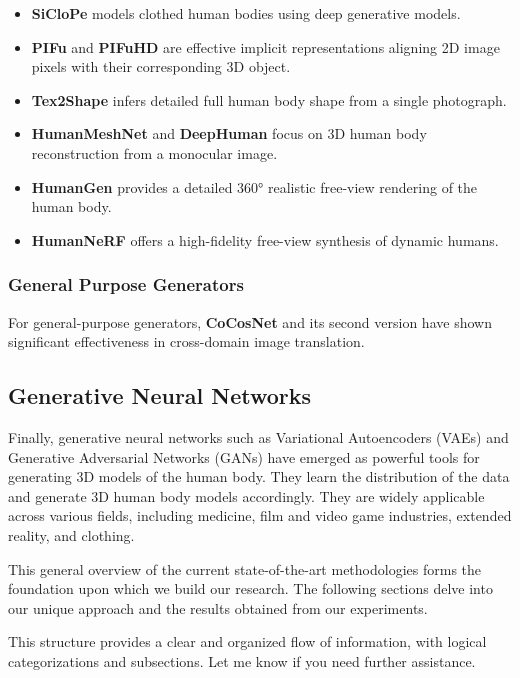 \begin{itemize}
	\item \textbf{SiCloPe} \cite{SiCloPe} models clothed human bodies using deep generative models.
	\item \textbf{PIFu} and \textbf{PIFuHD} \cite{PIFu, PIFuHD} are effective implicit representations aligning 2D image pixels with their corresponding 3D object.
	\item \textbf{Tex2Shape} \cite{Tex2Shape} infers detailed full human body shape from a single photograph.
	\item \textbf{HumanMeshNet} \cite{HumanMeshNet} and \textbf{DeepHuman} \cite{DeepHuman} focus on 3D human body reconstruction from a monocular image.
	\item \textbf{HumanGen} \cite{humangen} provides a detailed 360° realistic free-view rendering of the human body.
	\item \textbf{HumanNeRF} \cite{humannerf} offers a high-fidelity free-view synthesis of dynamic humans.
\end{itemize}

\subsubsection{General Purpose Generators}

For general-purpose generators, \textbf{CoCosNet} and its second version
\cite{CoCosNet, CoCosNet2} have shown significant effectiveness in cross-domain
image translation.

\subsection{Generative Neural Networks}

Finally, generative neural networks such as Variational Autoencoders (VAEs) and
Generative Adversarial Networks (GANs) have emerged as powerful tools for
generating 3D models of the human body. They learn the distribution of the data
and generate 3D human body models accordingly. They are widely applicable
across various fields, including medicine, film and video game industries,
extended reality, and clothing.

This general overview of the current state-of-the-art methodologies forms the
foundation upon which we build our research. The following sections delve into
our unique approach and the results obtained from our experiments.

This structure provides a clear and organized flow of information, with logical
categorizations and subsections. Let me know if you need further assistance.

